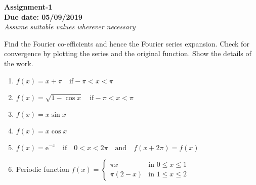 \documentclass[12pt]{article}
\begin{document}
\thispagestyle{empty}
 \begin{center}
 \textbf{ {\Large{Assignment-1}}\\Due date: 05/09/2019\\}
 \emph{Assume suitable values wherever necessary}
 \end{center}
 Find the Fourier co-efficients and hence the Fourier series
expansion. Check for convergence by plotting the series
and the original function. Show the details of the work.
 \begin{enumerate}
  \item $f(x)=x+\pi\quad \text{if}-\pi<x<\pi $\\
   
 \item $f(x)=\sqrt{1-\cos x}\quad \text{if}-\pi<x<\pi $\\  

\item $f(x)=x\sin x$\\

\item $f(x)=x\cos x$


\item $f(x)=\mathrm{e}^{-x}\quad \text{if}\quad 0<x<2\pi \quad\text{and} \quad f(x+2\pi)=f(x)$\\

\item Periodic function $f(x) = 
\begin{cases} 
\pi x &\mbox{in } 0\leq x\leq 1 \\
\pi(2-x) & \mbox{in } 1\leq x\leq 2 
\end{cases}$\\
 

\end{enumerate}
\end{document}
